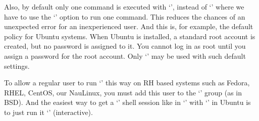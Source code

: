 Also, by default only one command is executed with `', instead of
`' where we have to use the `' option to run one command.
This reduces the chances of an unexpected error for an inexperienced user.
And this is, for example, the default policy for Ubuntu systems. When Ubuntu is
installed, a standard root account is created, but no password is assigned to it.
You cannot log in as root until you assign a password for the root account.
Only `' may be used with such default settings.

To allow a regular user to run `' this way on RH based systems
such as Fedora, RHEL, CentOS, our NauLinux, you must add this user to
the `' group (as in BSD). And the easiest way to get
a `' shell session like in `' with `'
in Ubuntu is to just run it `' (interactive).
